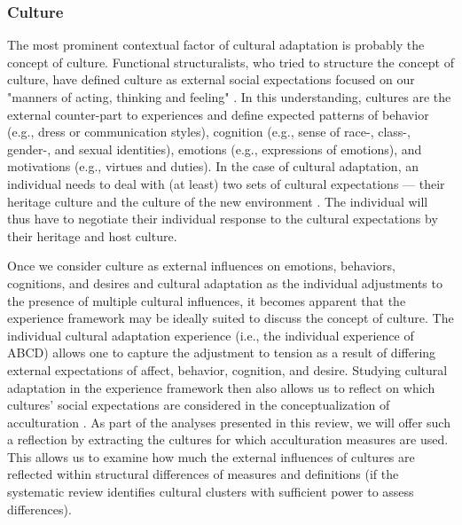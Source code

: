 \documentclass[man, 12pt, a4paper]{apa7}
\begin{document}
\subsubsection{Culture} 
The most prominent contextual factor of cultural adaptation is probably the concept of culture. Functional structuralists, who tried to structure the concept of culture, have defined culture as external social expectations focused on our "manners of acting, thinking and feeling" \citep[][p. 52; on social facts]{Durkheim1982}. In this understanding, cultures are the external counter-part to experiences and define expected patterns of behavior (e.g., dress or communication styles), cognition (e.g., sense of race-, class-, gender-, and sexual identities), emotions (e.g., expressions of emotions), and motivations (e.g., virtues and duties). In the case of cultural adaptation, an individual needs to deal with (at least) two sets of cultural expectations --- their heritage culture and the culture of the new environment \citep[e.g., see models of][]{Berry1997b, Berry2006a}. The individual will thus have to negotiate their individual response to the cultural expectations by their heritage and host culture.

Once we consider culture as external influences on emotions, behaviors, cognitions, and desires and cultural adaptation as the individual adjustments to the presence of multiple cultural influences, it becomes apparent that the experience framework may be ideally suited to discuss the concept of culture. The individual cultural adaptation experience (i.e., the individual experience of ABCD) allows one to capture the adjustment to tension as a result of differing external expectations of affect, behavior, cognition, and desire. Studying cultural adaptation in the experience framework then also allows us to reflect on which cultures' social expectations are considered in the conceptualization of acculturation \citep{Bhatia2001}. As part of the analyses presented in this review, we will offer such a reflection by extracting the cultures for which acculturation measures are used. This allows us to examine how much the external influences of cultures are reflected within structural differences of measures and definitions (if the systematic review identifies cultural clusters with sufficient power to assess differences).
\end{document}
